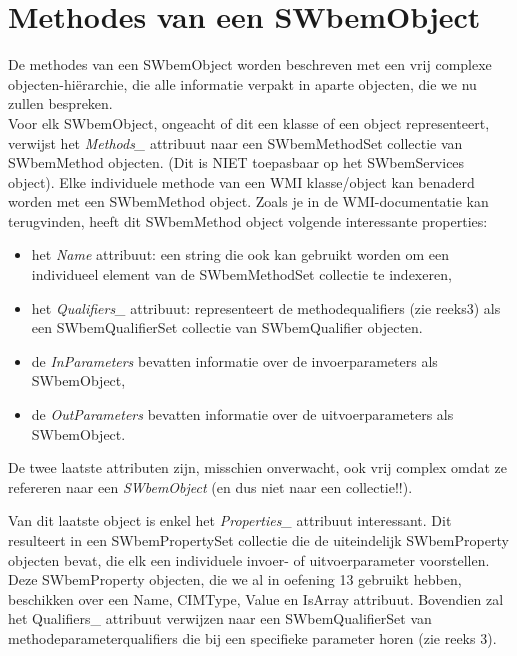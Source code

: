 \documentclass[11pt,a4paper]{report}
\begin{document}
\section{Methodes van een SWbemObject}
De methodes van een SWbemObject worden beschreven met een vrij complexe objecten-hiërarchie, die alle informatie verpakt in aparte objecten, die we nu zullen bespreken.
\\Voor elk SWbemObject, ongeacht of dit een klasse of een object representeert, verwijst het \textit{Methods\_} attribuut naar een SWbemMethodSet collectie van SWbemMethod objecten. (Dit is NIET toepasbaar op het SWbemServices object).
Elke individuele methode van een WMI klasse/object kan benaderd worden met een SWbemMethod object. Zoals je in de WMI-documentatie kan terugvinden, heeft dit SWbemMethod object volgende interessante properties:
\begin{itemize}
	\item het \textit{Name} attribuut: een string die ook kan gebruikt worden om een individueel element van de SWbemMethodSet collectie te indexeren,
	\item het \textit{Qualifiers\_} attribuut: representeert de methodequalifiers (zie reeks3) als een SWbemQualifierSet collectie van SWbemQualifier objecten.
	\item de \textit{InParameters} bevatten informatie over de invoerparameters als SWbemObject,
	\item de \textit{OutParameters} bevatten informatie over de uitvoerparameters als SWbemObject.
\end{itemize}
De twee laatste attributen zijn, misschien onverwacht, ook vrij complex omdat ze refereren naar een \textit{SWbemObject} (en dus niet naar een collectie!!). \par Van dit laatste object is enkel het \textit{Properties\_} attribuut interessant. Dit resulteert in een SWbemPropertySet collectie die de uiteindelijk SWbemProperty objecten bevat, die elk een individuele invoer- of uitvoerparameter voorstellen. Deze SWbemProperty objecten, die we al in oefening 13 gebruikt hebben, beschikken over een Name, CIMType, Value en IsArray attribuut. Bovendien zal het Qualifiers\_ attribuut verwijzen naar een SWbemQualifierSet van methodeparameterqualifiers die bij een specifieke parameter horen (zie reeks 3).
\end{document}
